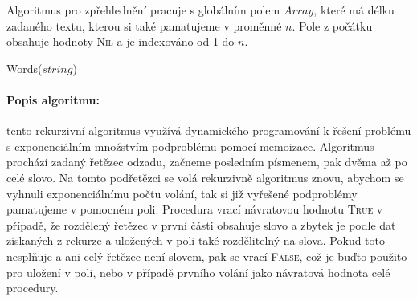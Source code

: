 \documentclass[12pt]{iv003}
\begin{document}
Algoritmus pro zpřehlednění pracuje s globálním polem $Array$, které má délku zadaného textu, kterou si také pamatujeme v proměnné $n$. Pole z počátku obsahuje hodnoty \textsc{Nil} a je indexováno od 1 do $n$.

{\small \begin{procedure}[H]
    \caption{Words($string$) }
     
\end{procedure}}
\paragraph{Popis algoritmu:} tento rekurzivní algoritmus využívá dynamického programování k řešení problému s exponenciálním množstvím podproblému pomocí memoizace. Algoritmus prochází zadaný řetězec odzadu, začneme posledním písmenem, pak dvěma až po celé slovo. Na tomto podřetězci se volá rekurzivně algoritmus znovu, abychom se vyhnuli exponenciálnímu počtu volání, tak si již vyřešené podproblémy pamatujeme v pomocném poli. Procedura vrací návratovou hodnotu \textsc{True} v případě, že rozdělený řetězec v první části obsahuje slovo a zbytek je podle dat získaných z rekurze a uložených v poli také rozdělitelný na slova. Pokud toto nesplňuje a ani celý řetězec není slovem, pak se vrací \textsc{False}, což je buďto použito pro uložení v poli, nebo v případě prvního volání jako návratová hodnota celé procedury.
\end{document}
